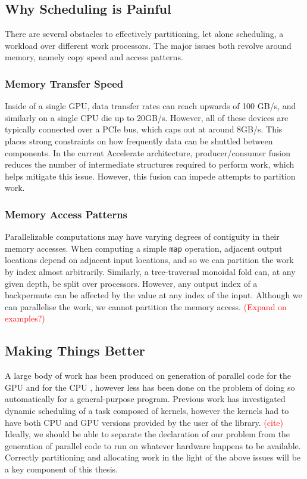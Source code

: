 \documentclass[a4paper,12pt]{article}
\newcommand{\red}[1]{\textcolor{red}{#1}}
\begin{document}
\subsection{Why Scheduling is Painful}
There are several obstacles to effectively partitioning, let alone scheduling, a workload over different work processors. 
The major issues both revolve around memory, namely copy speed and access patterns. 

\subsubsection*{Memory Transfer Speed} 
Inside of a single GPU, data transfer rates can reach upwards of 100 GB/s, and similarly on a single CPU die up to 20GB/s. 
However, all of these devices are typically connected over a PCIe bus, which caps out at around 8GB/s. 
This places strong constraints on how frequently data can be shuttled between components. 
In the current Accelerate architecture, producer/consumer fusion reduces the number of intermediate structures required to perform work, which helps mitigate this issue. 
However, this fusion can impede attempts to partition work.

\subsubsection*{Memory Access Patterns} 
Parallelizable computations may have varying degrees of contiguity in their memory accesses. 
When computing a simple \texttt{map} operation, adjacent output locations depend on adjacent input locations, and so we can partition the work by index almost arbitrarily. 
Similarly, a tree-traversal monoidal fold can, at any given depth, be split over processors. 
However, any output index of a backpermute can be affected by the value at any index of the input. 
Although we can parallelise the work, we cannot partition the memory access. \red{(Expand on examples?)}

\subsection{Making Things Better}

A large body of work has been produced on generation of parallel code for the GPU and for the CPU \citep{lee_transparent_2013}, however less has been done on the problem of doing so automatically for a general-purpose program. 
Previous work has investigated dynamic scheduling of a task composed of kernels, however the kernels had to have both CPU and GPU versions provided by the user of the library. 
\red{(cite)} 
Ideally, we should be able to separate the declaration of our problem from the generation of parallel code to run on whatever hardware happens to be available.
Correctly partitioning and allocating work in the light of the above issues will be a key component of this thesis.
\end{document}
